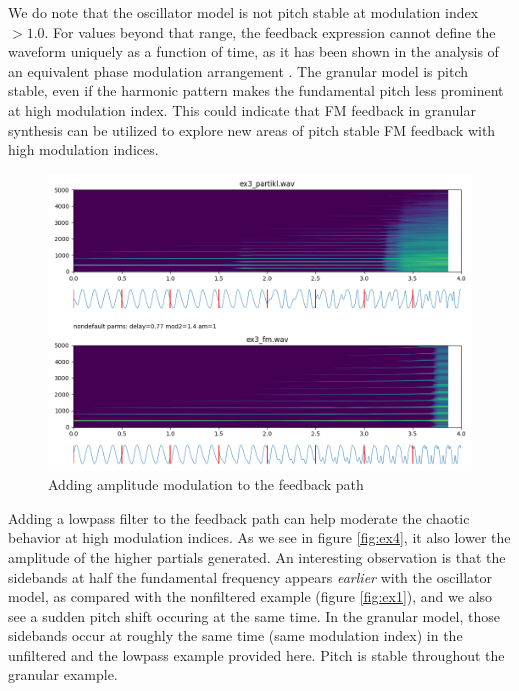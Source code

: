 \documentclass[runningheads,a4paper]{llncs}
\begin{document}
We do note that the oscillator model is not pitch stable at modulation index $> 1.0$.  For values beyond that range, the feedback expression 
cannot define the waveform uniquely as a function of time, as it has been shown in the analysis of an equivalent phase modulation arrangement \cite[p.61]{Benson}.
The granular model is pitch stable, even if the harmonic pattern makes the fundamental pitch less prominent at high modulation index. This could indicate that FM feedback in granular synthesis can be utilized to explore new areas of pitch stable FM feedback with high modulation indices.

\begin{figure}
	\centering
	\includegraphics[width=.95\textwidth]{ex3_compare.png}
	\caption{Adding amplitude modulation to the feedback path}
	\label{fig:ex3}
\end{figure}

Adding a lowpass filter to the feedback path can help moderate the chaotic behavior at high modulation indices. As we see in figure \ref{fig:ex4}, it also lower the amplitude of the higher partials generated. An interesting observation is that the sidebands at half the fundamental frequency appears \emph{earlier} with the oscillator model, as compared with the nonfiltered example (figure \ref{fig:ex1}), and we also see a sudden pitch shift occuring at the same time. In the granular model, those sidebands occur at roughly the same time (same modulation index) in the unfiltered and the lowpass example provided here. Pitch is stable throughout the granular example.
\end{document}
